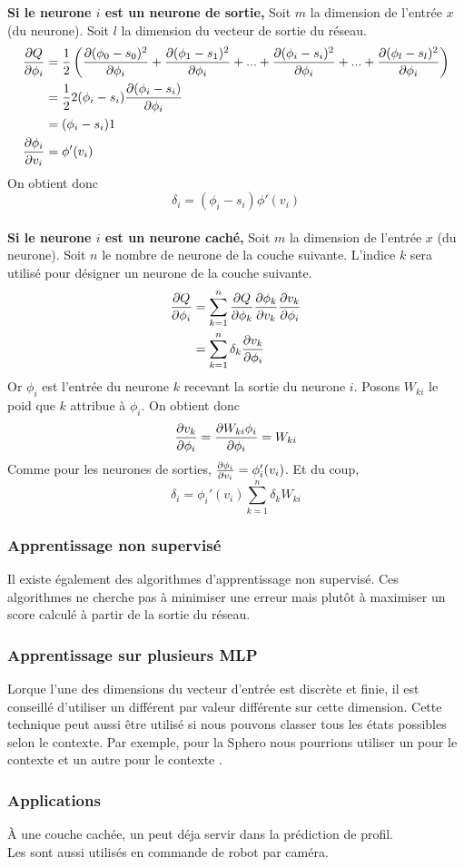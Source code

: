 \textbf{Si le neurone $i$ est un neurone de sortie,}
Soit $m$ la dimension de l'entrée $x$ (du neurone). Soit $l$ la dimension du vecteur de sortie du réseau.
\begin{equation}
 \begin{split}
  \frac{\partial Q}{\partial \phi_i} & = \frac{1}{2} \left( \frac{\partial (\phi_0 - s_0)^2}{\partial \phi_i} + \frac{\partial (\phi_1 - s_1)^2}{\partial \phi_i} + ... + \frac{\partial (\phi_i - s_i)^2}{\partial \phi_i} + ... + \frac{\partial (\phi_l - s_l)^2}{\partial \phi_i} \right)\\
  ~ & = \frac{1}{2}2(\phi_i - s_i)\frac{\partial (\phi_i - s_i)}{\partial \phi_i}\\
  ~ & = (\phi_i - s_i) 1\\
  \frac{\partial \phi_i}{\partial v_i} & = \phi'(v_i)
 \end{split}
\end{equation}\label{eq:a}
On obtient donc \[\delta_i = (\phi_i - s_i)\phi'(v_i)\]\\

\textbf{Si le neurone $i$ est un neurone caché,}
Soit $m$ la dimension de l'entrée $x$ (du neurone). Soit $n$ le nombre de neurone de la couche suivante.
L'indice $k$ sera utilisé pour désigner un neurone de la couche suivante.
\begin{equation}
 \begin{split}
  \frac{\partial Q}{\partial \phi_i} & = \sum_{k=1}^{n} \frac{\partial Q}{\partial \phi_k} \frac{\partial \phi_k}{\partial v_k} \frac{\partial v_k}{\partial \phi_i}\\
  ~ & = \sum_{k=1}^{n} \delta_k \frac{\partial v_k}{\partial \phi_i}
 \end{split}
\end{equation}
Or $\phi_i$ est l'entrée du neurone $k$ recevant la sortie du neurone $i$. Posons $W_{ki}$ le poid que $k$ attribue à $\phi_i$.
On obtient donc \[\frac{\partial v_k}{\partial \phi_i} = \frac{\partial W_{ki}\phi_i}{\partial \phi_i} = W_{ki}\]
Comme pour les neurones de sorties, $\frac{\partial \phi_i}{\partial v_i} = \phi_i'(v_i)$.
Et du coup, \[\delta_i = \phi_i'(v_i) \sum_{k=1}^{n} \delta_k W_{ki}\]
\subsubsection{Apprentissage non supervisé}
Il existe également des algorithmes d'apprentissage non supervisé.
Ces algorithmes ne cherche pas à minimiser une erreur mais plutôt à maximiser un score calculé à partir de la sortie du réseau.
\subsubsection{Apprentissage sur plusieurs MLP}
Lorque l'une des dimensions du vecteur d'entrée est discrète et finie, il est conseillé d'utiliser un \mlp différent par valeur différente sur cette dimension.\cite{Gauthier}
Cette technique peut aussi être utilisé si nous pouvons classer tous les états possibles selon le contexte.
Par exemple, pour la Sphero nous pourrions utiliser un \mlp pour le contexte  et un autre \mlp pour le contexte .
\subsubsection{Applications}
À une couche cachée, un \mlp peut déja servir dans la prédiction de profil.\cite{statistica}\\
Les \mlp sont aussi utilisés en commande de robot par caméra.\cite{Pomerleau}